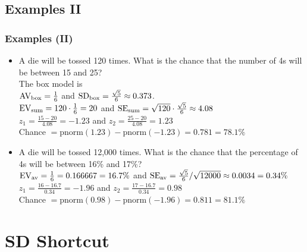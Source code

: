 \documentclass[t]{beamer}
\begin{document}
\subsection{Examples II}
\begin{frame}
\frametitle{Examples (II)}

\footnotesize

\begin{itemize}
\item<2-> A die will be tossed 120 times.  What is the chance that the 
    {\color{blue}number} of 4s will be
    between 15 and 25?\\[3pt]

The box model is \\[4pt]
    $\mbox{AV}_{\scriptsize\mbox{box}}  = \frac{1}{6}$ and 
    $\mbox{SD}_{\scriptsize\mbox{box}}  = \frac{\sqrt{5}}{6}\approx 0.373$.\\[3pt]
    $\mbox{EV}_{\scriptsize\mbox{sum}}  = 120\cdot \frac{1}{6} = 20$ and 
    $\mbox{SE}_{\scriptsize\mbox{sum}}  = \sqrt{120}\cdot \frac{\sqrt{5}}{6} \approx 4.08$\\[3pt]
    $z_1= \frac{15 - 20}{4.08} = -1.23$ and $z_2 = \frac{25-20}{4.08}=1.23$\\[3pt]
    Chance $= \mbox{pnorm}(1.23)  - \mbox{pnorm}(-1.23) = 0.781=78.1\%$
%
\item<3-> A die will be tossed 12,000 times.  What is the chance that the 
    {\color{darkgreen}percentage} of 4s will be
    between 16\% and 17\%?\\[3pt]
    $\mbox{EV}_{\scriptsize\mbox{av}}= \frac{1}{6} = 0.166667 = 16.7\%$ and 
    $\mbox{SE}_{\scriptsize\mbox{av}}  = \frac{\sqrt{5}}{6}/\sqrt{12000} \approx 0.0034=0.34\%$\\[3pt]
    $z_1= \frac{16 - 16.7}{0.34} = -1.96$ and $z_2 = \frac{17-16.7}{0.34}=0.98$\\[3pt]
    Chance $= \mbox{pnorm}(0.98)  - \mbox{pnorm}(-1.96) = 0.811=81.1\%$
\end{itemize}
\end{frame}

\section{SD Shortcut}
\end{document}
